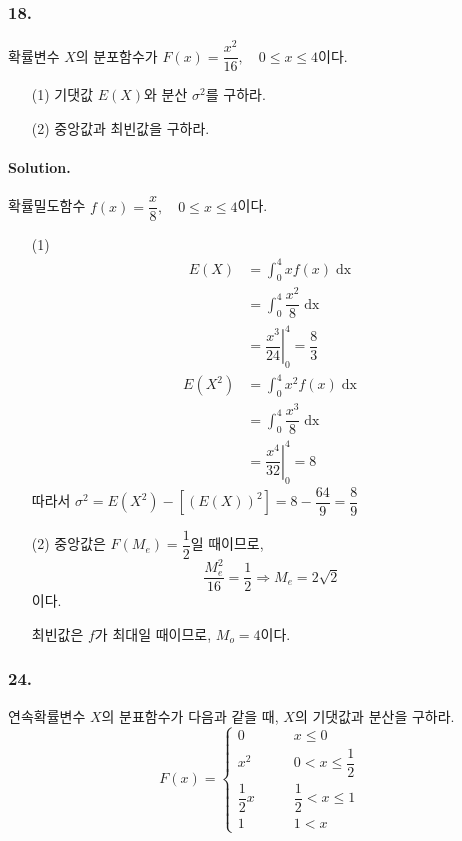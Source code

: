 \subsubsection{18.} 확률변수 $X$의 분포함수가 $F\left(x\right) = \dfrac{x^2}{16}, \quad 0\leq x\leq 4$이다.
\begin{itemize}
  \item [(1)] 기댓값 $E\left(X\right)$와 분산 $\sigma^2$를 구하라.
  \item [(2)] 중앙값과 최빈값을 구하라.
\end{itemize}

\paragraph{Solution.} 확률밀도함수 $f\left(x\right) = \dfrac{x}{8}, \quad 0\leq x\leq 4$이다.
\begin{itemize}
  \item [(1)] \begin{align*}
  	E\left(X\right) &= \int_0^4 xf\left(x\right) \mathop{dx}\\
  	&= \int_0^4 \dfrac{x^2}{8} \mathop{dx}\\
  	&= \left.\dfrac{x^3}{24}\right|_0^4 = \dfrac{8}{3}
  \end{align*}
  \begin{align*}
  	E\left(X^2\right) &= \int_0^4 x^2 f\left(x\right) \mathop{dx}\\
  	&= \int_0^4 \dfrac{x^3}{8} \mathop{dx}\\
  	&= \left.\dfrac{x^4}{32}\right|_0^4 = 8
  \end{align*}
  따라서 $\sigma^2 = E\left(X^2\right) - \left[\left(E\left(X\right)\right)^2\right] = 8 - \dfrac{64}{9} = \dfrac{8}{9}$\\
  \item [(2)] 중앙값은 $F\left(M_e\right) = \dfrac{1}{2}$일 때이므로, \[\dfrac{M_e^2}{16} = \dfrac{1}{2} \Rightarrow M_e = 2\sqrt{2}\]이다.

	최빈값은 $f$가 최대일 때이므로, $M_o = 4$이다.
\end{itemize}

\subsubsection{24.} 연속확률변수 $X$의 분표함수가 다음과 같을 때, $X$의 기댓값과 분산을 구하라.
\[F\left(x\right) = \left\{
\begin{array}{ll}
	0 & \qquad x\leq 0 \\
	x^2 & \qquad 0< x\leq \dfrac{1}{2} \\
	\dfrac{1}{2}x & \qquad \dfrac{1}{2} < x \leq 1\\
	1 & \qquad 1 < x
\end{array}
\right. \]

